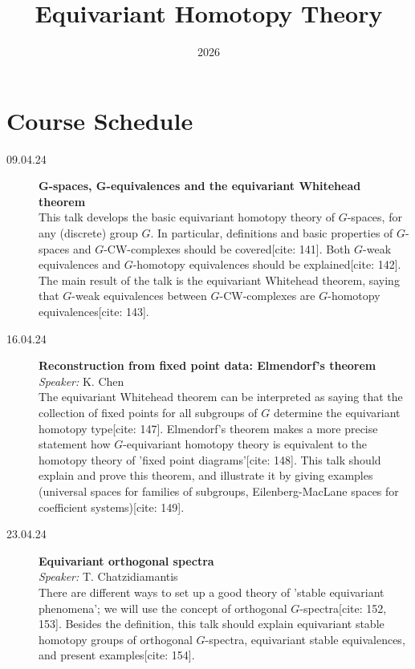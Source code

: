 \documentclass[11pt, openany]{book} %
\title{\textbf{Equivariant Homotopy Theory}}
\author{}
\date{2026}
\begin{document}
\frontmatter
\maketitle
\tableofcontents

\mainmatter


\section*{Course Schedule}

\begin{description}

\item[09.04.24] \textbf{G-spaces, G-equivalences and the equivariant Whitehead theorem} \\
This talk develops the basic equivariant homotopy theory of $G$-spaces, for any (discrete) group $G$. In particular, definitions and basic properties of $G$-spaces and $G$-CW-complexes should be covered[cite: 141]. Both $G$-weak equivalences and $G$-homotopy equivalences should be explained[cite: 142]. The main result of the talk is the equivariant Whitehead theorem, saying that $G$-weak equivalences between $G$-CW-complexes are $G$-homotopy equivalences[cite: 143].

\item[16.04.24] \textbf{Reconstruction from fixed point data: Elmendorf's theorem} \\
\textit{Speaker:} K. Chen \\
The equivariant Whitehead theorem can be interpreted as saying that the collection of fixed points for all subgroups of $G$ determine the equivariant homotopy type[cite: 147]. Elmendorf's theorem makes a more precise statement how $G$-equivariant homotopy theory is equivalent to the homotopy theory of 'fixed point diagrams'[cite: 148]. This talk should explain and prove this theorem, and illustrate it by giving examples (universal spaces for families of subgroups, Eilenberg-MacLane spaces for coefficient systems)[cite: 149].

\item[23.04.24] \textbf{Equivariant orthogonal spectra} \\
\textit{Speaker:} T. Chatzidiamantis \\
There are different ways to set up a good theory of 'stable equivariant phenomena'; we will use the concept of orthogonal $G$-spectra[cite: 152, 153]. Besides the definition, this talk should explain equivariant stable homotopy groups of orthogonal $G$-spectra, equivariant stable equivalences, and present examples[cite: 154].


\end{description}
\end{document}
